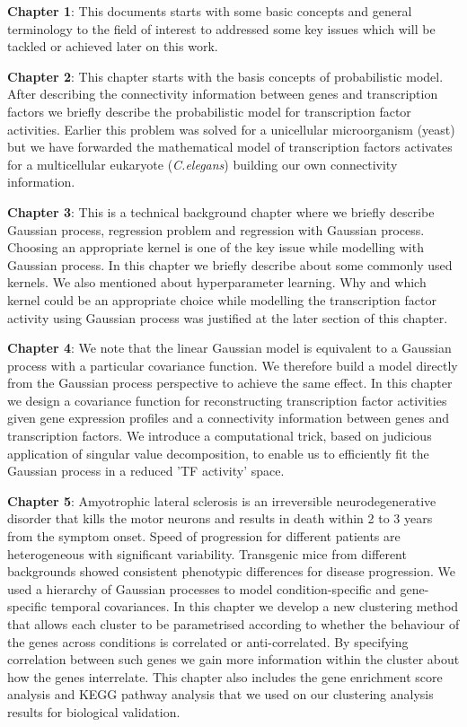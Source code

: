 \textbf{Chapter 1}: This documents starts with some basic concepts and general terminology to the field of interest to addressed some key issues which will be tackled or achieved later on this work.

\textbf{Chapter 2}: This chapter starts with the basis concepts of probabilistic model. After describing the connectivity information between genes and transcription factors we briefly describe the probabilistic model for transcription factor activities. Earlier this problem was solved for a unicellular microorganism (yeast) but we have forwarded the mathematical model of transcription factors activates for a multicellular eukaryote (\textit{C.elegans}) building our own connectivity information.
 
\textbf{Chapter 3}:
This is a technical background chapter where we briefly describe Gaussian process, regression problem and regression with Gaussian process. Choosing an appropriate kernel is one of the key issue while modelling with Gaussian process. In this chapter we briefly describe about some commonly used kernels. We also mentioned about hyperparameter learning. Why and which kernel could be an appropriate choice while modelling the transcription factor activity using Gaussian process was justified at the later section of this chapter.

\textbf{Chapter 4}:
We note that the linear Gaussian model is equivalent to a Gaussian process with a particular covariance function. We therefore build a model directly from the Gaussian process perspective to achieve the same 
effect. In this chapter we design a covariance function for reconstructing transcription factor activities given gene expression profiles and a connectivity information between genes and transcription factors. We introduce a computational trick, based on  judicious application of singular value decomposition, to enable us to efficiently fit the Gaussian process in a reduced 'TF activity' space. 

\textbf{Chapter 5}:
Amyotrophic lateral sclerosis is an irreversible neurodegenerative disorder that kills the motor neurons and results in death within 2 to 3 years from the symptom onset.  Speed of progression for different patients are heterogeneous with significant variability. Transgenic mice from different backgrounds showed consistent phenotypic differences for disease progression. We used a hierarchy of Gaussian processes to model condition-specific and gene-specific temporal covariances. In this chapter we develop a new clustering method that allows each cluster to be parametrised according to whether the behaviour of the genes across conditions is correlated or anti-correlated. By specifying correlation between such genes we gain more information within the cluster about how the genes interrelate. This chapter also includes the gene enrichment score analysis and KEGG pathway analysis that we used on our clustering analysis results for biological validation.

